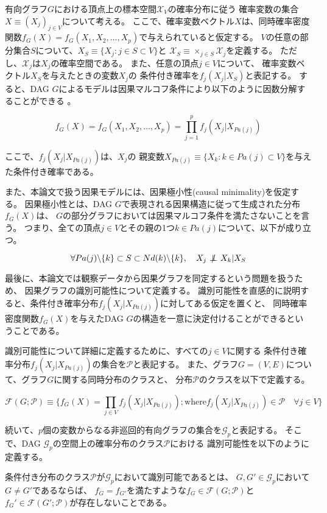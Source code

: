 有向グラフ$G$における頂点上の標本空間$\mathcal X_V$の確率分布に従う
確率変数の集合$X \equiv (X_j)_{j \in V}$について考える。
ここで、確率変数ベクトル$X$は、同時確率密度関数$f_G(X)=f_G(X_1, X_2, \dots, X_p)$で与えられていると仮定する。
$V$の任意の部分集合$S$について、$X_S \equiv \{X_j:j\in S \subset V \}$と
$\mathcal X_S \equiv \times_{j \in S} \mathcal X_j$を定義する。
ただし、$\mathcal X_j$は$X_j$の確率空間である。
また、任意の頂点$j\in V$について、
確率変数ベクトル$X_S$を与えたときの変数$X_j$の
条件付き確率を$f_j(X_j|X_S)$と表記する。
すると、DAG $G$によるモデルは因果マルコフ条件により以下のように因数分解することができる
\cite{Pearl2009-oh}。

\begin{equation}
  f_G(X)=f_G(X_1, X_2, \dots, X_p) = \prod_{j=1}^p f_j(X_j | X_{Pa(j)})
  \label{eq:factorization}
\end{equation}

ここで、$f_j(X_j | X_{Pa(j)})$は、$X_j$の
親変数$X_{Pa(j)} \equiv \{ X_k:k\in Pa(j) \subset V \}$を与えた条件付き確率である。

また、本論文で扱う因果モデルには、因果極小性(causal minimality)を仮定する。
因果極小性とは、DAG $G$で表現される因果構造に従って生成された分布$f_G(X)$は、
$G$の部分グラフにおいては因果マルコフ条件を満たさないことを言う\cite{Zhang2011-da}。
つまり、全ての頂点$j \in V$とその親の1つ$k \in Pa(j)$について、以下が成り立つ。

\begin{equation}
  \forall Pa(j)\backslash\{k\} \subset S \subset Nd(k) \backslash\{k\},
  \quad X_j \notindep X_k | X_S
  \label{minimality}
\end{equation}

最後に、本論文では観察データから因果グラフを同定するという問題を扱うため、
因果グラフの識別可能性について定義する。
識別可能性を直感的に説明すると、条件付き確率分布$f_j(X_j|X_{Pa(j)})$に対してある仮定を置くと、
同時確率密度関数$f_G(X)$を与えたDAG $G$の構造を一意に決定付けることができるということである。

識別可能性について詳細に定義するために、すべての$j \in V$に関する
条件付き確率分布$f_j(X_j|X_{Pa(j)})$の集合を$\mathcal P$と表記する。
また、グラフ$G=(V,E)$について、グラフ$G$に関する同時分布のクラスと、
分布$\mathcal P$のクラスを以下で定義する。

\begin{equation}
  \mathcal F(G;\mathcal P) \equiv \{ f_G(X) = \prod_{j \in V} f_j(X_j|X_{Pa(j)}) ;
  \text{where} f_j(X_j|X_{Pa(j)}) \in \mathcal P \quad \forall j \in V \}
\end{equation}

続いて、$p$個の変数からなる非巡回的有向グラフの集合を$\mathcal G_p$と表記する。
そこで、DAG $\mathcal G_p$の空間上の確率分布のクラス$\mathcal P$における
識別可能性を以下のように定義する。

\begin{df}[識別可能性]
  条件付き分布のクラス$\mathcal P$が$\mathcal G_p$において識別可能であるとは、
  $G,G' \in \mathcal G_p$において$G \neq G'$であるならば、
  $f_G = f_{G'}$を満たすような$f_G \in \mathcal F(G; \mathcal P)$と
  $f_G' \in \mathcal F(G'; \mathcal P)$が存在しないことである。
\end{df}

